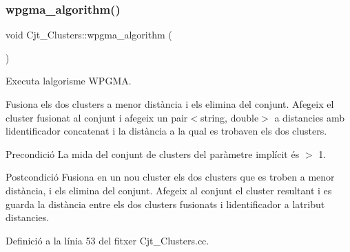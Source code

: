 \subsubsection{\texorpdfstring{wpgma\+\_\+algorithm()}{wpgma\_algorithm()}}
{\footnotesize\ttfamily void Cjt\+\_\+\+Clusters\+::wpgma\+\_\+algorithm (\begin{DoxyParamCaption}{ }\end{DoxyParamCaption})}



Executa l\textquotesingle{}algorisme W\+P\+G\+MA. 

Fusiona els dos clusters a menor distància i els elimina del conjunt. Afegeix el cluster fusionat al conjunt i afegeix un pair$<$string, double$>$ a distancies amb l\textquotesingle{}identificador concatenat i la distància a la qual es trobaven els dos clusters.

\begin{DoxyPrecond}{Precondició}
La mida del conjunt de clusters del paràmetre implícit és $>$ 1. 
\end{DoxyPrecond}
\begin{DoxyPostcond}{Postcondició}
Fusiona en un nou cluster els dos clusters que es troben a menor distància, i els elimina del conjunt. Afegeix al conjunt el cluster resultant i es guarda la distància entre els dos clusters fusionats i l\textquotesingle{}identificador a l\textquotesingle{}atribut distancies. 
\end{DoxyPostcond}


Definició a la línia 53 del fitxer Cjt\+\_\+\+Clusters.\+cc.


